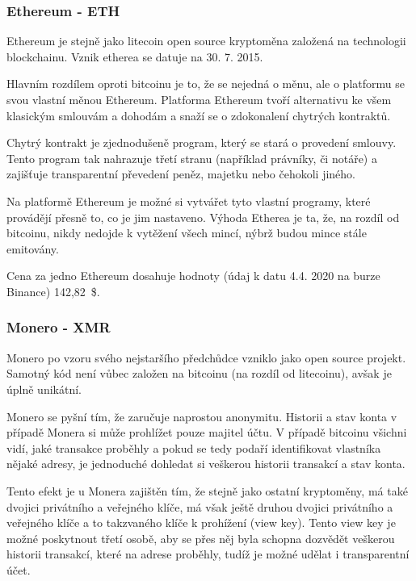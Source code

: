 \documentclass[thesis=B,czech]{FITthesis}[2019/03/21]
\begin{document}
\subsubsection{Ethereum - ETH}
Ethereum je stejně jako litecoin open source kryptoměna založená na technologii blockchainu. Vznik etherea se datuje na 30. 7. 2015. 

Hlavním rozdílem oproti bitcoinu je to, že se nejedná o měnu, ale o platformu se svou vlastní měnou Ethereum. Platforma Ethereum tvoří alternativu ke všem klasickým smlouvám a dohodám a snaží se o zdokonalení chytrých kontraktů. \cite{btc_vs_eth}

Chytrý kontrakt je zjednodušeně program, který se stará o provedení smlouvy. Tento program tak nahrazuje třetí stranu (například právníky, či notáře) a zajišťuje transparentní převedení peněz, majetku nebo čehokoli jiného. \cite{ethereum}

Na platformě Ethereum je možné si vytvářet tyto vlastní programy, které provádějí přesně to, co je jim nastaveno. \cite{ethereum} Výhoda Etherea je ta, že, na rozdíl od bitcoinu, nikdy nedojde k vytěžení všech mincí, nýbrž budou mince stále emitovány. \cite{alza_monero}

Cena za jedno Ethereum dosahuje hodnoty (údaj k datu 4.4. 2020 na burze Binance) 142,82~\$. \cite{binance_markets}

\subsubsection{Monero - XMR}
Monero po vzoru svého nejstaršího předchůdce vzniklo jako open source projekt. Samotný kód není vůbec založen na bitcoinu (na rozdíl od litecoinu), avšak je úplně unikátní. 

Monero se pyšní tím, že zaručuje naprostou anonymitu. Historii a stav konta v případě Monera si může prohlížet pouze majitel účtu. V případě bitcoinu všichni vidí, jaké transakce proběhly a pokud se tedy podaří identifikovat vlastníka nějaké adresy, je jednoduché dohledat si veškerou historii transakcí a stav konta.

Tento efekt je u Monera zajištěn tím, že stejně jako ostatní kryptoměny, má také dvojici privátního a veřejného klíče, má však ještě druhou dvojici privátního a veřejného klíče a to takzvaného klíče k prohížení (view key). Tento view key je možné poskytnout třetí osobě, aby se přes něj byla schopna dozvědět veškerou historii transakcí, které na adrese proběhly, tudíž je možné udělat i transparentní účet.
\end{document}
